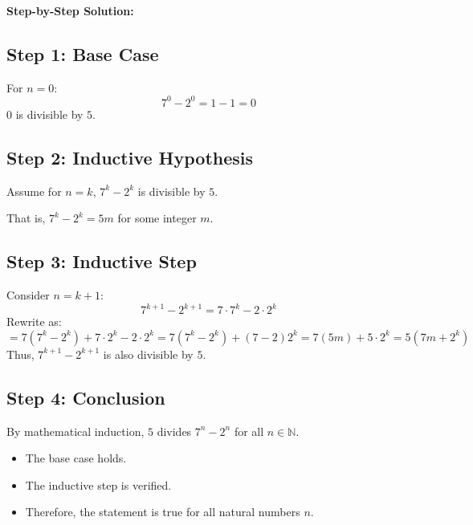 \documentclass[14pt,a4paper]{article}
\begin{document}
\textbf{Step-by-Step Solution:}

\subsection*{Step 1: Base Case}
For $n = 0$:
\[
7^0 - 2^0 = 1 - 1 = 0
\]
$0$ is divisible by $5$.

\subsection*{Step 2: Inductive Hypothesis}
Assume for $n = k$, $7^k - 2^k$ is divisible by $5$.

That is, $7^k - 2^k = 5m$ for some integer $m$.

\subsection*{Step 3: Inductive Step}
Consider $n = k + 1$:
\[
7^{k+1} - 2^{k+1} = 7 \cdot 7^k - 2 \cdot 2^k
\]
Rewrite as:
\[
= 7(7^k - 2^k) + 7 \cdot 2^k - 2 \cdot 2^k
= 7(7^k - 2^k) + (7 - 2)2^k
= 7(5m) + 5 \cdot 2^k
= 5(7m + 2^k)
\]
Thus, $7^{k+1} - 2^{k+1}$ is also divisible by $5$.

\subsection*{Step 4: Conclusion}
By mathematical induction, $5$ divides $7^n - 2^n$ for all $n \in \mathbb{N}$.

\vspace{2em}
\begin{tcolorbox}[colback=yellow!10!white, title=Summary]
\begin{itemize}
    \item The base case holds.
    \item The inductive step is verified.
    \item Therefore, the statement is true for all natural numbers $n$.
\end{itemize}
\end{tcolorbox}

\end{document}
